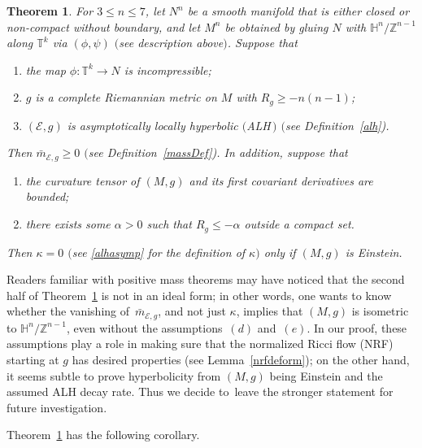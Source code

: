 \documentclass[10pt,a4paper]{amsart}
\numberwithin{equation}{section}
\newtheorem{Theorem}{Theorem}[section]
\def\H{\mathbb{H}}
\def\T{\mathbb{T}}
\def\Z{\mathbb{Z}}
\def\Ecal{\mathcal{E}}
\begin{document}
\begin{Theorem}\label{alhpmt4}
For $3\leq n\leq 7$, let $N^n$ be a smooth manifold that is either closed or non-compact without boundary, and let
$M^n$ be obtained by gluing $N$ with $\H^n/\Z^{n-1}$ along $\T^{k}$ via $(\phi,\psi)$  $($see description above$)$.
Suppose that
\begin{enumerate}[$(a)$]\itemsep=0pt
	\item the map $\phi\colon \T^k\rightarrow N$ is incompressible; \label{incprsAssu}
\item $g$ is a complete Riemannian metric on $M$ with $R_g\geq -n(n-1)$;%
\item  $(\Ecal, g)$ is asymptotically locally hyperbolic $($ALH\,$)$ $($see Definition~{\rm \ref{alh})}.	
\end{enumerate}
Then $\bar m_{\Ecal,g}\ge 0$ $($see Definition~{\rm \ref{massDef})}. In addition, suppose that
\begin{enumerate}[$(a)$]\itemsep=0pt\setcounter{enumi}{3}
\item the curvature tensor of $(M,g)$ and its first covariant derivatives are bounded;\label{curvbdAssu}
\item there exists some $\alpha>0$ such that $R_g \leq -\alpha$ outside a compact set.
	\label{RbdAssu}
\end{enumerate}
Then $\kappa = 0$ $($see \eqref{alhasymp} for the definition of $\kappa$$)$ only if $(M,g)$ is Einstein.
\end{Theorem}


Readers familiar with positive mass theorems may
have noticed that the second half of Theorem~\ref{alhpmt4}
is not in an ideal form; in other words, one wants to know whether
the vanishing of~$\bar m_{\Ecal,g}$, and not just $\kappa$, implies that $(M,g)$ is isometric to $\H^n/\Z^{n-1}$, even without the assumptions~$(d)$ and~$(e)$. In our proof, these assumptions play a role in making sure that the
normalized Ricci flow (NRF) starting at $g$ has desired properties (see Lemma~\ref{nrfdeform});
on the other hand,
it seems subtle to prove
hyperbolicity from $(M,g)$ being Einstein and the assumed ALH decay rate. Thus we decide to~leave the stronger statement for future investigation.

Theorem~\ref{alhpmt4} has the following corollary.
\end{document}
